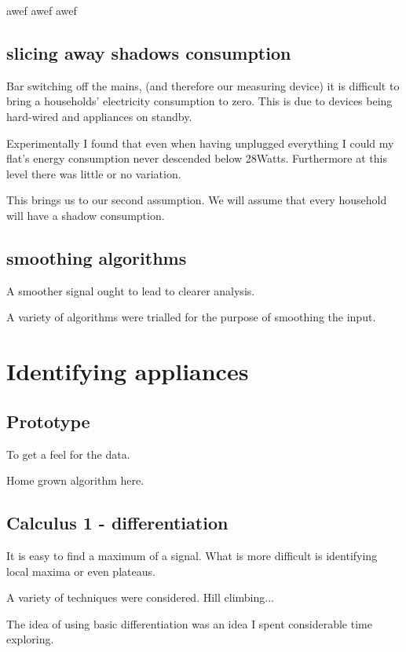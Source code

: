 awef awef awef

\subsection{slicing away shadows consumption}

Bar switching off the mains, (and therefore our measuring device) it is difficult to bring a households' electricity consumption to zero. This is due to devices being hard-wired and appliances on standby.

Experimentally I found that even when having unplugged everything I could my flat's energy consumption never descended below 28Watts. Furthermore at this level there was little or no variation.

This brings us to our second assumption. We will assume that every household will have a shadow consumption.


\subsection{smoothing algorithms}

A smoother signal ought to lead to clearer analysis.

A variety of algorithms were trialled for the purpose of smoothing the input. 

\section{Identifying appliances}

\subsection{Prototype}

To get a feel for the data.

Home grown algorithm here.

\subsection{Calculus 1 - differentiation}

It is easy to find a maximum of a signal. What is more difficult is identifying local maxima or even plateaus.

A variety of techniques were considered. Hill climbing...

The idea of using basic differentiation was an idea I spent considerable time exploring.

